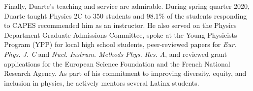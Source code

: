 \documentclass[11pt]{article}
\begin{document}
Finally, Duarte's teaching and service are admirable.
During spring quarter 2020, Duarte taught Physics 2C to 350 students and 98.1\% of the students responding to CAPES recommended him as an instructor.
He also served on the Physics Department Graduate Admissions Committee, spoke at the Young Physicists Program (YPP) for local high school students, peer-reviewed papers for \emph{Eur. Phys. J. C} and \emph{Nucl. Instrum. Methods Phys. Res. A}, and reviewed grant applications for the European Science Foundation and the French National Research Agency.
As part of his commitment to improving diversity, equity, and inclusion in physics, he actively mentors several Latinx students.
\end{document}
